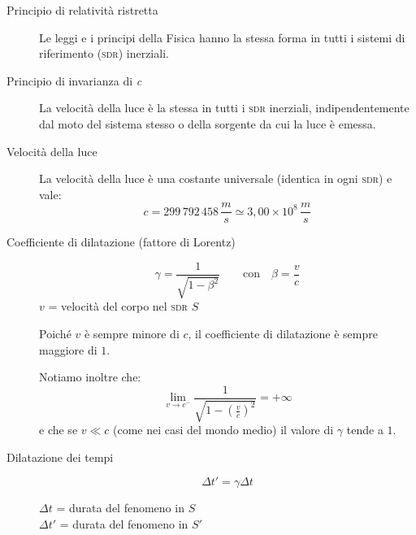 \documentclass[a4paper,11pt,italian]{article}
\begin{document}
\begin{description}
  \item[Principio di relatività ristretta]
  Le leggi e i principi della Fisica hanno la stessa forma in tutti i sistemi di riferimento (\textsc{sdr}) inerziali.
  
  \item[Principio di invarianza di \textit{c}]
  La velocità della luce è la stessa in tutti i \textsc{sdr} inerziali, indipendentemente dal moto del sistema stesso o della sorgente da cui la luce è emessa.

  \item[Velocità della luce] La velocità della luce è una costante universale (identica in ogni \textsc{sdr}) e vale:
  \[ c = 299\,  792\, 458\,	\frac{m}{s} \simeq 3,00 \times 10^8 \,	\frac{m}{s} \]
  
%   
  
  \item[Coefficiente di dilatazione (fattore di Lorentz)]
  \[ \gamma = \frac{1}{\sqrt{1-\beta^2}} \qquad \mathrm{con} \quad \beta = \frac{v}{c} \]
  $ v $ = velocità del corpo nel \textsc{sdr} $ S $
  
  Poiché $ v $ è sempre minore di $ c $, il coefficiente di dilatazione è sempre maggiore di $ 1 $.

  Notiamo inoltre che:
  \[ \lim_{v \rightarrow c^{-}} \frac{1}{\sqrt{1-(\frac{v}{c})^2}} = + \infty \]
  e che se $ v \ll c $ (come nei casi del mondo medio) il valore di $ \gamma $ tende a $ 1 $.
  
  \item[Dilatazione dei tempi]
  \[ \Delta t' = \gamma \Delta t \]
  \begin{multicols}{2}
  $ \Delta t $ = durata del fenomeno in $ S $\\
  $ \Delta t' $ = durata del fenomeno in $ S' $
  \end{multicols}
  

\end{description}
\end{document}
